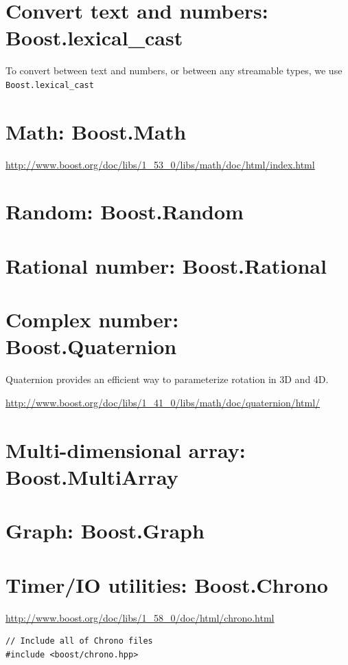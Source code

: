 \section{Convert text and numbers: Boost.lexical\_cast}

To convert between text and numbers, or between any streamable types, we use
\verb!Boost.lexical_cast!


\section{Math: Boost.Math}
\label{sec:boost_math}


\url{http://www.boost.org/doc/libs/1_53_0/libs/math/doc/html/index.html}

\section{Random: Boost.Random}


\section{Rational number: Boost.Rational}

\section{Complex number: Boost.Quaternion}

Quaternion provides an efficient way to parameterize rotation in 3D and 4D.

\url{http://www.boost.org/doc/libs/1_41_0/libs/math/doc/quaternion/html/}

\section{Multi-dimensional array: Boost.MultiArray}



\section{Graph: Boost.Graph}

\section{Timer/IO utilities: Boost.Chrono}
\label{sec:Boost-Chrono}
\label{sec:Chrono-library}
\label{sec:Boost.Chrono}

\url{http://www.boost.org/doc/libs/1_58_0/doc/html/chrono.html}
\begin{lstlisting}
// Include all of Chrono files
#include <boost/chrono.hpp>

\end{lstlisting}


